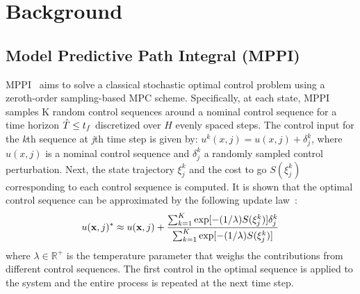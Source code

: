 \section{\label{background}Background}

\subsection{\label{background_mppi}Model Predictive Path Integral (MPPI)}

MPPI~\cite{mppi,mppi_tro} aims to solve a classical stochastic optimal control problem using a zeroth-order sampling-based MPC scheme.
Specifically, at each state, MPPI samples K random control sequences around a nominal control sequence for a time horizon $\hat{T} \leq t_f$ discretized over $H$ evenly spaced steps. The control input for the \textit{k}th sequence at \textit{j}th time step is given by: $u^k(x, j) = u(x, j) + \delta_j^k$, where $u(x, j)$ is a nominal control sequence and $\delta_j^k$ a randomly sampled control perturbation. Next, the state trajectory $\xi_j^k$ and the cost to go $S(\xi_j^k)$ corresponding to each control sequence is computed. It is shown that the optimal control sequence can be approximated by the following update law~\cite{mppi_theory}:
%
\begin{equation}\label{eq:update_law}
u(\mathbf{x},j)^{\ast}\approx u(\mathbf{x},j)+{\frac{\sum_{k=1}^{K}\exp[-(1/\lambda)S(\xi_j^k)]\delta_j^k}{\sum_{k=1}^{K}\exp[-(1/\lambda)S(\xi_j^k)]}}
\end{equation}
%
where $\lambda \in \mathbb{R}^+$ is the temperature parameter that weighs the contributions from different control sequences. The first control in the optimal sequence is applied to the system and the entire process is repeated at the next time step.

